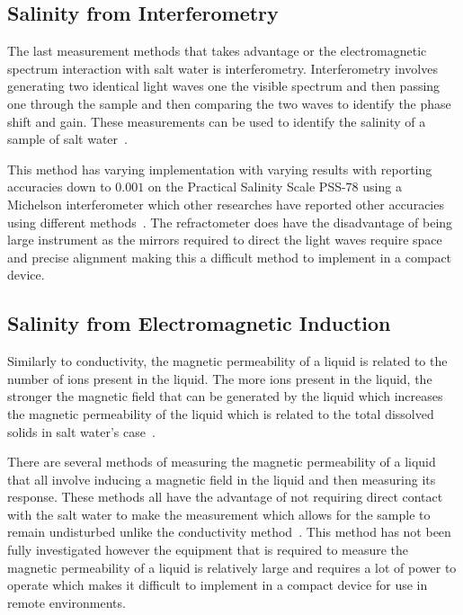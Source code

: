 \subsection{Salinity from Interferometry}

The last measurement methods that takes advantage or the electromagnetic spectrum interaction with salt water is interferometry.
Interferometry involves generating two identical light waves one the visible spectrum and then passing one through the sample and then comparing the two waves to identify the phase shift and gain.
These measurements can be used to identify the salinity of a sample of salt water~\cite{liao_interferometer_seawater_salinity_2023}.

This method has varying implementation with varying results with  reporting accuracies down to $0.001$ on the Practical Salinity Scale PSS-78 using a Michelson interferometer which other researches have reported other accuracies using different methods~\cite{possetti_interferometer_salinity_measurement_2009}\cite{nguyen_interferometer_salinity_measurement_2009}\cite{zhao_interferometer_salinity_measurement_2009}.
The refractometer does have the disadvantage of being large instrument as the mirrors required to direct the light waves require space and precise alignment making this a difficult method to implement in a compact device. 

\subsection{Salinity from Electromagnetic Induction}

Similarly to conductivity, the magnetic permeability of a liquid is related to the number of ions present in the liquid.
The more ions present in the liquid, the stronger the magnetic field that can be generated by the liquid which increases the magnetic permeability of the liquid which is related to the total dissolved solids in salt water's case~\cite{somaraju_electromagnetic_salinity_2006}.

There are several methods of measuring the magnetic permeability of a liquid that all involve inducing a magnetic field in the liquid and then measuring its response.
These methods all have the advantage of not requiring direct contact with the salt water to make the measurement which allows for the sample to remain undisturbed unlike the conductivity method~\cite{tengesdal_electromagnetic_salinity_2014}.
This method has not been fully investigated however the equipment that is required to measure the magnetic permeability of a liquid is relatively large and requires a lot of power to operate which makes it difficult to implement in a compact device for use in remote environments.

